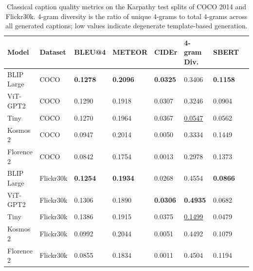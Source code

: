 \begin{table}[ht]
	\centering
	\caption{Classical caption quality metrics on the Karpathy test 
		splits of COCO 2014 and Flickr30k. 4-gram diversity is the ratio 
		of unique 4-grams to total 4-grams across all generated captions; 
		low values indicate degenerate template-based generation.}
	\label{tab:caption_quality_classical}
	\begin{tabular}{llllllll}
		\hline
		\textbf{Model} & \textbf{Dataset} & \textbf{BLEU@4} & 
		\textbf{METEOR} & \textbf{CIDEr} & \textbf{4-gram Div.} & 
		\textbf{SBERT} \\
		\hline
		BLIP Large   & COCO      & \textbf{0.1278} & \textbf{0.2096} & \textbf{0.0325} & 0.3406 & \textbf{0.1158} \\
		ViT-GPT2     & COCO      & 0.1290          & 0.1918          & 0.0307          & 0.3246 & 0.0904 \\
		Tiny         & COCO      & 0.1270          & 0.1964          & 0.0367          & \underline{0.0547} & 0.0562 \\
		Kosmos 2     & COCO      & 0.0947          & 0.2014          & 0.0050          & 0.3334 & 0.1449 \\
		Florence 2   & COCO      & 0.0842          & 0.1754          & 0.0013          & 0.2978 & 0.1373 \\
		\hline
		BLIP Large   & Flickr30k & \textbf{0.1254} & \textbf{0.1934} & 0.0268          & 0.4554 & \textbf{0.0866} \\
		ViT-GPT2     & Flickr30k & 0.1306          & 0.1890          & \textbf{0.0306} & \textbf{0.4935} & 0.0682 \\
		Tiny         & Flickr30k & 0.1386          & 0.1915          & 0.0375          & \underline{0.1499} & 0.0479 \\
		Kosmos 2     & Flickr30k & 0.0992          & 0.2044          & 0.0051          & 0.4492 & 0.1079 \\
		Florence 2   & Flickr30k & 0.0855          & 0.1834          & 0.0011          & 0.4504 & 0.1194 \\
		\hline
	\end{tabular}
\end{table}

